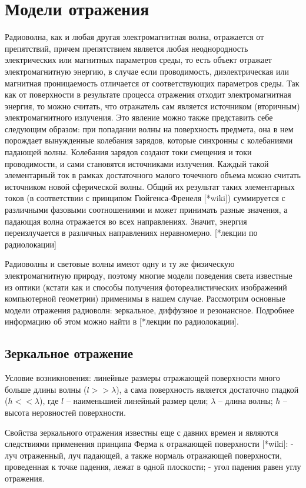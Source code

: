 \newpage
\section*{Модели отражения} 

Радиоволна, как и любая другая электромагнитная волна, отражается от препятствий, причем препятствием является любая неоднородность электрических или магнитных параметров среды, то есть объект отражает электромагнитную энергию, в случае если проводимость, диэлектрическая или магнитная проницаемость отличается от соответствующих параметров среды.
Так как от поверхности в результате процесса отражения отходит электромагнитная энергия, то можно считать, что отражатель сам является источником (вторичным) электромагнитного излучения. Это явление можно также представить себе следующим образом: при попадании волны на поверхность предмета, она в нем порождает вынужденные колебания зарядов, которые синхронны с колебаниями падающей волны. Колебания зарядов создают токи смещения и токи проводимости, и сами становятся источниками излучения. Каждый такой элементарный ток в рамках достаточного малого точечного объема можно считать источником новой сферической волны. Общий их результат таких элементарных токов (в соответствии с принципом Гюйгенса-Френеля [*wiki]) суммируется с различными фазовыми соотношениями и может принимать разные значения, а падающая волна отражается во всех направлениях. Значит, энергия переизлучается в различных направлениях неравномерно. [*лекции по радиолокации]  

Радиоволны и световые волны имеют одну и ту же физическую электромагнитную природу, поэтому многие модели поведения света известные из оптики (кстати как и способы получения фотореалистических изображений компьютерной геометрии) применимы в нашем случае. Рассмотрим основные модели отражения радиоволн: зеркальное, диффузное и резонансное. Подробнее информацию об этом можно найти в [*лекции по радиолокации].

\subsection*{Зеркальное отражение}

Условие возникновения: линейные размеры отражающей поверхности много больше длины волны ($ l >> \lambda $), а сама поверхность является достаточно гладкой ($ h << \lambda $), где $ l $ -- наименьшией линейный размер цели; $ \lambda $ -- длина волны; $ h $ -- высота неровностей поверхности. 

Свойства зеркального отражения известны еще с давних времен и являются следствиями применения принципа Ферма к отражающей поверхности  [*wiki]:
- луч отраженный, луч падающей, а также нормаль отражающей поверхности, проведенная к точке падения, лежат в одной плоскости;
- угол падения равен углу отражения.


